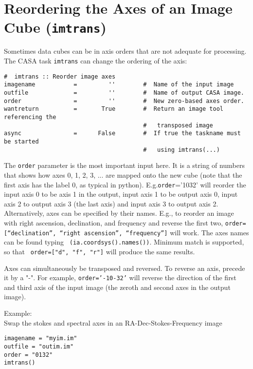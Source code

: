 \section{Reordering the Axes of an Image Cube ({\tt imtrans})}
\label{section:analysis.imtrans}

Sometimes data cubes can be in axis orders that are not adequate for
processing. The CASA task {\tt imtrans} can change the ordering of the axis:
\small
\begin{verbatim}
#  imtrans :: Reorder image axes
imagename           =         ''        #  Name of the input image
outfile             =         ''        #  Name of output CASA image.
order               =         ''        #  New zero-based axes order.
wantreturn          =       True        #  Return an image tool referencing the
                                        #   transposed image
async               =      False        #  If true the taskname must be started
                                        #   using imtrans(...)
\end{verbatim}
\normalsize




The {\tt order} parameter is the most important input here. It is a
string of numbers that shows how axes 0, 1, 2, 3, ... are mapped onto
the new cube (note that the first axis has the label 0, as typical in
python). E.g.{\tt order}='1032' will reorder the input axis 0 to be
axis 1 in the output, input axis 1 to be output axis 0, input axis 2
to output axis 3 (the last axis) and input axis 3 to output axis
2. Alternatively, axes can be specified by their names. E.g., to reorder
an image with right ascension, declination, and frequency and reverse
the first two, {\tt order=[``declination'', ``right ascension'',
  ``frequency'']} will work. The axes names can be found typing {\tt
  (ia.coordsys().names())}. Minimum match is supported, so that  {\tt
  order=["d", "f", "r"]} will produce the same results.

Axes can simultaneously be transposed and reversed. To reverse an axis,
precede it by a "-". For example, {\tt order='-10-32'} will reverse
the direction of the first and third axis of the input image (the zeroth and second
axes in the output image).

Example:\\

Swap the stokes and spectral axes in an RA-Dec-Stokes-Frequency image
\small
\begin{verbatim}
imagename = "myim.im"
outfile = "outim.im"
order = "0132"
imtrans()
\end{verbatim}

